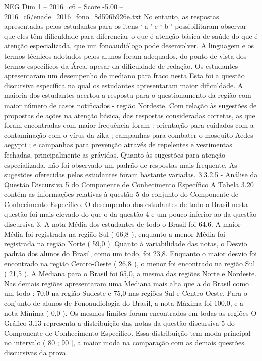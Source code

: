 \begin{textsample}{NEG Dim 1 – 2016\_c6 – Score -5.00 – 2016\_c6/enade\_2016\_fono\_8d596b926e.txt}
No entanto, as respostas apresentadas pelos estudantes para os itens ‘ a ’ e ‘ b ’ possibilitaram observar que eles têm dificuldade para diferenciar o que é atenção básica de saúde do que é atenção especializada, que um fonoaudiólogo pode desenvolver.
A linguagem e os termos técnicos adotados pelos alunos foram adequados, do ponto de vista dos termos específicos da Área, apesar da dificuldade de redação.
Os estudantes apresentaram um desempenho de mediano para fraco nesta Esta foi a questão discursiva específica na qual os estudantes apresentaram maior dificuldade.
A maioria dos estudantes acertou a resposta para o questionamento da região com maior número de casos notificados - região Nordeste.
Com relação às sugestões de propostas de ações na atenção básica, das respostas consideradas corretas, as que foram encontradas com maior frequência foram : orientação para cuidados com a contaminação com o vírus da zika ; campanhas para combater o mosquito Aedes aegypti ; e campanhas para prevenção através de repelentes e vestimentas fechadas, principalmente as grávidas.
Quanto às sugestões para atenção especializada, não foi observado um padrão de respostas mais frequente.
As sugestões oferecidas pelos estudantes foram bastante variadas. 3.3.2.5 - Análise da Questão Discursiva 5 do Componente de Conhecimento Específico A Tabela 3.20 contém as informações relativas à questão 5 do conjunto do Componente de Conhecimento Específico.
O desempenho dos estudantes de todo o Brasil nesta questão foi mais elevado do que o da questão 4 e um pouco inferior ao da questão discursiva 3.
A nota Média dos estudantes de todo o Brasil foi 64,6.
A maior Média foi registrada na região Sul ( 66,8 ), enquanto a menor Média foi registrada na região Norte ( 59,0 ).
Quanto à variabilidade das notas, o Desvio padrão dos alunos do Brasil, como um todo, foi 23,8.
Enquanto o maior desvio foi encontrado na região Centro-Oeste ( 26,8 ), o menor foi encontrado na região Sul ( 21,5 ).
A Mediana para o Brasil foi 65,0, a mesma das regiões Norte e Nordeste.
Nas demais regiões apresentaram uma Mediana mais alta que a do Brasil como um todo : 70,0 na região Sudeste e 75,0 nas regiões Sul e Centro-Oeste.
Para o conjunto de alunos de Fonoaudiologia do Brasil, a nota Máxima foi 100,0, e a nota Mínima ( 0,0 ).
Os mesmos limites foram encontrados em todas as regiões O Gráfico 3.13 representa a distribuição das notas da questão discursiva 5 do Componente de Conhecimento Específico.
Essa distribuição tem moda principal no intervalo ( 80 ; 90 ], a maior moda na comparação com as demais questões discursivas da prova.

\end{textsample}
